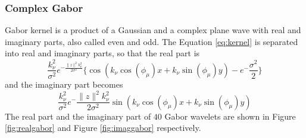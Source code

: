\subsubsection{Complex Gabor}
Gabor kernel is a product of a Gaussian and a complex plane wave with real and imaginary parts, also called even and odd. The \mbox{Equation} \ref{eq:kernel} is separated into real and imaginary parts, so that the real part is
\begin{equation}\label{eq:real}
\frac{k_{\nu}^2}{\sigma^2}e^{-{\frac{\|z\|^2 k_{\nu}^2}{2\sigma^2}}} \{\cos(k_{\nu}\cos(\phi_{\mu})x+k_{\nu}\sin(\phi_{\mu})y)-e^-{\frac{\sigma^2}{2}}\}
\end{equation}
and the imaginary part becomes
\begin{equation}\label{eq:imag}
\frac{k_{\nu}^2}{\sigma^2} e^-{\frac{\|z\|^2 k_{\nu}^2}{2\sigma^2}} \sin(k_{\nu}\cos(\phi_{\mu})x+k_{\nu}\sin(\phi_{\mu})y)
\end{equation}
The real part and the imaginary part of $40$ Gabor wavelets are shown in \mbox{Figure} \ref{fig:realgabor} and \mbox{Figure} \ref{fig:imaggabor} respectively.
